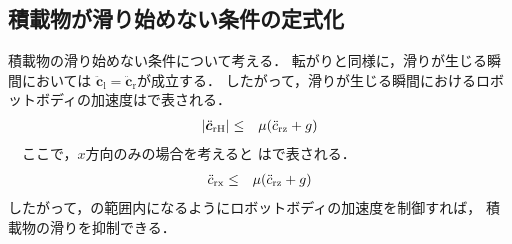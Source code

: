 \subsection{積載物が滑り始めない条件の定式化}
\label {2.4}
積載物の滑り始めない条件について考える．
転がりと同様に，滑りが生じる瞬間においては
${\ddot{\bm{c}}_{\mathrm{l}}}={\ddot{\bm{c}}_{\mathrm{r}}}$が成立する．
したがって，滑りが生じる瞬間におけるロボットボディの加速度はで表される．\\
\begin{eqnarray}
  \equlabel{1.6}
  |{\ddot{\bm{c}}_{\mathrm{rH}}}| &\leq& \mu({\ddot{c}_{\mathrm{rz}}}+g)
\end{eqnarray}
　ここで，$x$方向のみの場合を考えると
はで表される．\\
\begin{eqnarray}
  \equlabel{1.7}
  {\ddot{c}_{\mathrm{rx}}} &\leq& \mu({\ddot{c}_{\mathrm{rz}}}+{g})
\end{eqnarray}
したがって，の範囲内になるようにロボットボディの加速度を制御すれば，
積載物の滑りを抑制できる．


